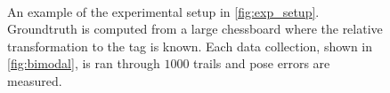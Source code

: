 \begin{figure}[h]
 \\
\caption{An example of the experimental setup in \ref{fig:exp_setup}. Groundtruth is computed from a large chessboard where the relative transformation to the tag is known. Each data collection, shown in \ref{fig:bimodal}, is ran through $1000$ trails and pose errors are measured.}
\label{fig:angle_result}
\end{figure}

